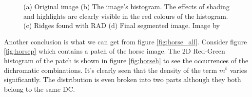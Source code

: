 \documentclass[twoside,11pt]{article}
\begin{document}
\begin{figure}[!t]
\centering
{}
\caption{(a) Original image (b) The image's histogram. The effects of shading
and highlights are clearly visible in the red colours of the histogram. (c)
Ridges found with RAD (d) Final segmented image. Image by \cite{1478239}}
\label{fig:pepper_rad}
\end{figure}

Another conclusion is what we can get from figure \ref{fig:horse_all}. Consider
figure \ref{fig:horsep} which contains a patch of the horse image. The 2D
Red-Green histogram of the patch is shown in figure \ref{fig:horseh} to see the
occurrences of the dichromatic combinations. It's clearly seen that the density
of the term $m^{b}$ varies significantly. The distribution is even broken into
two parts although they both belong to the same DC.
\end{document}
